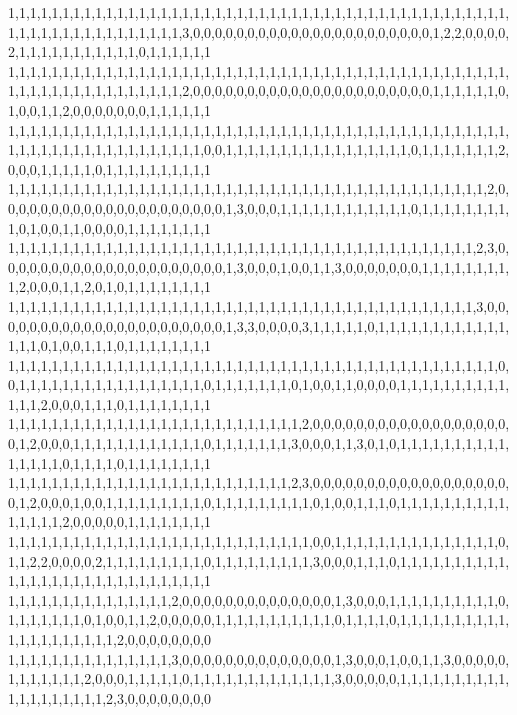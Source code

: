 1,1,1,1,1,1,1,1,1,1,1,1,1,1,1,1,1,1,1,1,1,1,1,1,1,1,1,1,1,1,1,1,1,1,1,1,1,1,1,1,1,1,1,1,1,1,1,1,1,1,1,1,1,1,1,1,1,1,1,1,1,1,3,0,0,0,0,0,0,0,0,0,0,0,0,0,0,0,0,0,0,0,0,0,0,1,2,2,0,0,0,0,2,1,1,1,1,1,1,1,1,1,1,1,0,1,1,1,1,1,1
1,1,1,1,1,1,1,1,1,1,1,1,1,1,1,1,1,1,1,1,1,1,1,1,1,1,1,1,1,1,1,1,1,1,1,1,1,1,1,1,1,1,1,1,1,1,1,1,1,1,1,1,1,1,1,1,1,1,1,1,1,1,2,0,0,0,0,0,0,0,0,0,0,0,0,0,0,0,0,0,0,0,0,0,0,1,1,1,1,1,1,0,1,0,0,1,1,2,0,0,0,0,0,0,0,1,1,1,1,1,1
1,1,1,1,1,1,1,1,1,1,1,1,1,1,1,1,1,1,1,1,1,1,1,1,1,1,1,1,1,1,1,1,1,1,1,1,1,1,1,1,1,1,1,1,1,1,1,1,1,1,1,1,1,1,1,1,1,1,1,1,1,1,1,1,0,0,1,1,1,1,1,1,1,1,1,1,1,1,1,1,1,1,1,0,1,1,1,1,1,1,1,2,0,0,0,1,1,1,1,1,0,1,1,1,1,1,1,1,1,1,1
1,1,1,1,1,1,1,1,1,1,1,1,1,1,1,1,1,1,1,1,1,1,1,1,1,1,1,1,1,1,1,1,1,1,1,1,1,1,1,1,1,1,1,1,2,0,0,0,0,0,0,0,0,0,0,0,0,0,0,0,0,0,0,0,0,0,1,3,0,0,0,1,1,1,1,1,1,1,1,1,1,1,1,0,1,1,1,1,1,1,1,1,1,0,1,0,0,1,1,0,0,0,0,1,1,1,1,1,1,1,1
1,1,1,1,1,1,1,1,1,1,1,1,1,1,1,1,1,1,1,1,1,1,1,1,1,1,1,1,1,1,1,1,1,1,1,1,1,1,1,1,1,1,1,2,3,0,0,0,0,0,0,0,0,0,0,0,0,0,0,0,0,0,0,0,0,0,1,3,0,0,0,1,0,0,1,1,3,0,0,0,0,0,0,0,1,1,1,1,1,1,1,1,1,2,0,0,0,1,1,2,0,1,0,1,1,1,1,1,1,1,1
1,1,1,1,1,1,1,1,1,1,1,1,1,1,1,1,1,1,1,1,1,1,1,1,1,1,1,1,1,1,1,1,1,1,1,1,1,1,1,1,1,1,1,3,0,0,0,0,0,0,0,0,0,0,0,0,0,0,0,0,0,0,0,0,0,0,1,3,3,0,0,0,0,3,1,1,1,1,1,0,1,1,1,1,1,1,1,1,1,1,1,1,1,1,1,0,1,0,0,1,1,1,0,1,1,1,1,1,1,1,1
1,1,1,1,1,1,1,1,1,1,1,1,1,1,1,1,1,1,1,1,1,1,1,1,1,1,1,1,1,1,1,1,1,1,1,1,1,1,1,1,1,1,1,1,1,0,0,1,1,1,1,1,1,1,1,1,1,1,1,1,1,1,1,1,0,1,1,1,1,1,1,1,0,1,0,0,1,1,0,0,0,0,1,1,1,1,1,1,1,1,1,1,1,1,1,2,0,0,0,1,1,1,0,1,1,1,1,1,1,1,1
1,1,1,1,1,1,1,1,1,1,1,1,1,1,1,1,1,1,1,1,1,1,1,1,1,1,1,2,0,0,0,0,0,0,0,0,0,0,0,0,0,0,0,0,0,0,0,1,2,0,0,0,1,1,1,1,1,1,1,1,1,1,1,1,0,1,1,1,1,1,1,1,3,0,0,0,1,1,3,0,1,0,1,1,1,1,1,1,1,1,1,1,1,1,1,1,1,0,1,1,1,1,0,1,1,1,1,1,1,1,1
1,1,1,1,1,1,1,1,1,1,1,1,1,1,1,1,1,1,1,1,1,1,1,1,1,1,2,3,0,0,0,0,0,0,0,0,0,0,0,0,0,0,0,0,0,0,0,1,2,0,0,0,1,0,0,1,1,1,1,1,1,1,1,1,0,1,1,1,1,1,1,1,1,1,0,1,0,0,1,1,1,0,1,1,1,1,1,1,1,1,1,1,1,1,1,1,1,2,0,0,0,0,0,1,1,1,1,1,1,1,1
1,1,1,1,1,1,1,1,1,1,1,1,1,1,1,1,1,1,1,1,1,1,1,1,1,1,1,1,0,0,1,1,1,1,1,1,1,1,1,1,1,1,1,1,1,0,1,1,2,2,0,0,0,0,2,1,1,1,1,1,1,1,1,1,0,1,1,1,1,1,1,1,1,1,3,0,0,0,1,1,1,0,1,1,1,1,1,1,1,1,1,1,1,1,1,1,1,1,1,1,1,1,1,1,1,1,1,1,1,1,1
1,1,1,1,1,1,1,1,1,1,1,1,1,1,1,2,0,0,0,0,0,0,0,0,0,0,0,0,0,0,1,3,0,0,0,1,1,1,1,1,1,1,1,1,1,0,1,1,1,1,1,1,1,0,1,0,0,1,1,2,0,0,0,0,0,1,1,1,1,1,1,1,1,1,1,1,0,1,1,1,1,0,1,1,1,1,1,1,1,1,1,1,1,1,1,1,1,1,1,1,1,1,2,0,0,0,0,0,0,0,0
1,1,1,1,1,1,1,1,1,1,1,1,1,1,1,3,0,0,0,0,0,0,0,0,0,0,0,0,0,0,1,3,0,0,0,1,0,0,1,1,3,0,0,0,0,0,1,1,1,1,1,1,1,2,0,0,0,1,1,1,1,1,0,1,1,1,1,1,1,1,1,1,1,1,1,1,3,0,0,0,0,0,1,1,1,1,1,1,1,1,1,1,1,1,1,1,1,1,1,1,1,2,3,0,0,0,0,0,0,0,0
